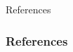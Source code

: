 \documentclass{beamer}
\begin{document}
		\begin{frame}[standout]
		References
		  
		\end{frame}

	
		\begin{frame}[allowframebreaks]\frametitle{References}
			
		    {}
		\end{frame}

\end{document}
